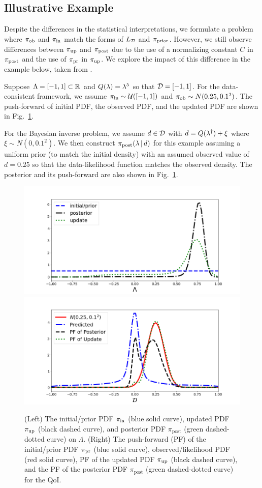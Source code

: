 \subsection{Illustrative Example}
Despite the differences in the statistical interpretations, we formulate a problem where $\operatorname*{\pi_{ob}}$ and $\operatorname*{\pi_{in}}$ match the forms of $L_{\mathcal{D}}$ and $\operatorname*{\pi_{prior}}$.
However, we still observe differences between $\operatorname*{\pi_{up}}$ and $\operatorname*{\pi_{post}}$ due to the use of a normalizing constant $C$ in $\operatorname*{\pi_{post}}$ and the use of $\operatorname*{\pi_{pr}}$ in $\operatorname*{\pi_{up}}$.
We explore the impact of this difference in the example below, taken from \cite{BJW18}.



\begin{ex}
Suppose ${\Lambda} = [-1,1]\subset\mathbb{R}$ and $Q(\lambda)=\lambda^5$ so that $\mathcal{D} = [-1,1]$.
For the data-consistent framework, we assume $\operatorname*{\pi_{in}}\sim \mathcal{U}([-1,1])$ and $\operatorname*{\pi_{ob}}\sim N(0.25,0.1^2)$.
The push-forward of initial PDF, the observed PDF, and the updated PDF are shown in Fig.~\ref{fig:bayes-comparison}.

For the Bayesian inverse problem, we assume $d\in \mathcal{D}$ with $d=Q(\lambda^\dagger)+\xi$ where $\xi\sim N(0,0.1^2)$.
We then construct $\pi_{\text{post}}(\lambda \, |\, d)$ for this example assuming a uniform prior (to match the initial density) with an assumed observed value of $d=0.25$ so that the data-likelihood function matches the observed density.
The posterior and its push-forward are also shown in Fig.~\ref{fig:bayes-comparison}.


\begin{figure}[htbp]
\centering
   \includegraphics[width=0.49\linewidth]{figures/bip-vs-sip-1.png}
   \includegraphics[width=0.49\linewidth]{figures/bip-vs-sip-pf-1.png}
 \caption{(Left) The initial/prior PDF $\operatorname*{\pi_{in}}$ (blue solid curve), updated PDF $\operatorname*{\pi_{up}}$ (black dashed curve), and posterior PDF $\pi_\text{post}$ (green dashed-dotted curve) on $\Lambda$.
 (Right) The push-forward (PF) of the initial/prior PDF $\operatorname*{\pi_{pr}}$ (blue solid curve), observed/likelihood PDF (red solid curve), PF of the updated PDF $\operatorname*{\pi_{up}}$ (black dashed curve), and the PF of the posterior PDF $\pi_\text{post}$ (green dashed-dotted curve) for the QoI.}
 \label{fig:bayes-comparison}
\end{figure}



\end{ex}
